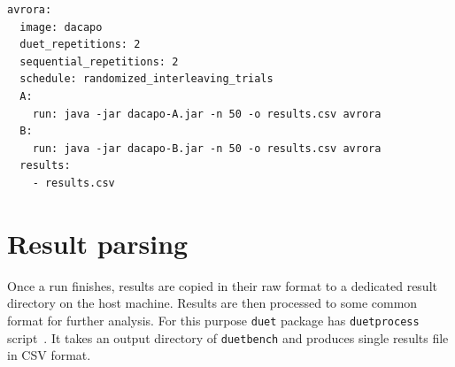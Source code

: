 \begin{listing}
    \begin{lstlisting}
avrora:
  image: dacapo
  duet_repetitions: 2
  sequential_repetitions: 2
  schedule: randomized_interleaving_trials
  A:
    run: java -jar dacapo-A.jar -n 50 -o results.csv avrora
  B:
    run: java -jar dacapo-B.jar -n 50 -o results.csv avrora
  results:
    - results.csv
    \end{lstlisting}
    \caption{
        Example part of YAML configuration file for \lstinline{duetbench} that runs \lstinline{avrora} benchmark from the DaCapo suite.
        In this case, both A and B versions are packaged in a single container image as Java JAR archives.
        Run command specifies how to invoke the DaCapo harness --- 50 iterations, results in \lstinline{results.csv} and run only \lstinline{avrora} benchmark.
        All the result files or directories need to be specified in \lstinline{results} array field.
        Note the correspondence between user input fields from this configuration and parameters in angled brackets from~\cref{fig:duetbench_sequence}.
        Furthermore, users can specify the number of repetitions for both asynchronous duet and sequential measurements, as well as the scheduling strategy for those runs.
    }
    \label{lst:config}
\end{listing}

\section{Result parsing}
\label{sec:result_parsing}

Once a run finishes, results are copied in their raw format to a dedicated result directory on the host machine.
Results are then processed to some common format for further analysis.
For this purpose \lstinline{duet} package has \lstinline{duetprocess} script~\cite{wiki}.
It takes an output directory of \lstinline{duetbench} and produces single results file in CSV format.

